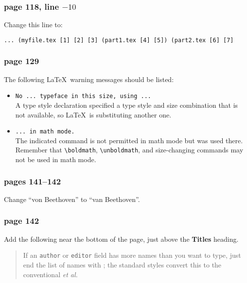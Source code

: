 \subsubsection*{page 118, line $-10$}
 
Change this line to:
\begin{small}
\begin{verbatim}
... (myfile.tex [1] [2] [3] (part1.tex [4] [5]) (part2.tex [6] [7]
\end{verbatim}
\end{small}
 
\subsubsection*{page 129}
 
The following \LaTeX\ warning messages should be listed:
\begin{itemize}
\item[] {\tt No ... typeface in this size, using ...}\\
A type style declaration specified a type style and size combination
that is not available, so \LaTeX\ is substituting another one.
 
\item[] {\tt ... in math mode.}\\
The indicated command is not permitted in math mode but was used there.
Remember that \verb|\boldmath|, \verb|\unboldmath|, and size-changing
commands may not be used in math mode.
\end{itemize}
 
 
\subsubsection*{pages 141--142}
 
Change ``von Beethoven'' to ``van Beethoven''.
 
 
\subsubsection*{page 142}
 
Add the following near the bottom of the page, just above the
{\bf Titles} heading.
\begin{quote}
If an {\tt author} or {\tt editor} field has more names than you want to
type, just end the list of names with ; the standard styles convert this to the conventional {\em et
al.}
\end{quote}
 
